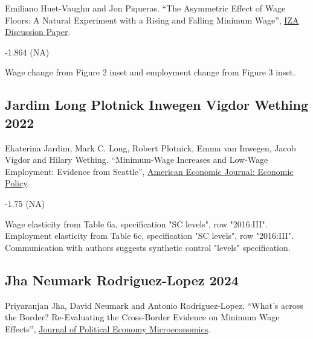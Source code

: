 \noindent Emiliano Huet-Vaughn and Jon Piqueras. ``The Asymmetric Effect of Wage Floors: A Natural Experiment with a Rising and Falling Minimum Wage'', \href{https://docs.iza.org/dp16684.pdf}{IZA Discussion Paper}.

\vspace{0.7em}

 -1.864 (NA)

\vspace{0.7em}

 Wage change from Figure 2 inset and employment change from Figure 3 inset.

\subsection*{Jardim Long Plotnick Inwegen Vigdor Wething 2022}
\vspace{-0.7em}

\noindent Ekaterina Jardim, Mark C. Long, Robert Plotnick, Emma van Inwegen, Jacob Vigdor and Hilary Wething. ``Minimum-Wage Increases and Low-Wage Employment: Evidence from Seattle'', \href{https://doi.org/10.1257/pol.20180578}{American Economic Journal: Economic Policy}.

\vspace{0.7em}

 -1.75 (NA)

\vspace{0.7em}

 Wage elasticity from Table 6a, specification "SC levels", row "2016:III". Employment elasticity from Table 6c, specification "SC levels", row "2016:III". Communication with authors suggests synthetic control "levels" specification.

\subsection*{Jha Neumark Rodriguez-Lopez 2024}
\vspace{-0.7em}

\noindent Priyaranjan Jha, David Neumark and Antonio Rodriguez-Lopez. ``What's across the Border? Re-Evaluating the Cross-Border Evidence on Minimum Wage Effects'', \href{https://sites.socsci.uci.edu/~jantonio/Papers/minwage_czones.pdf}{Journal of Political Economy Microeconomics}.

\vspace{0.7em}


